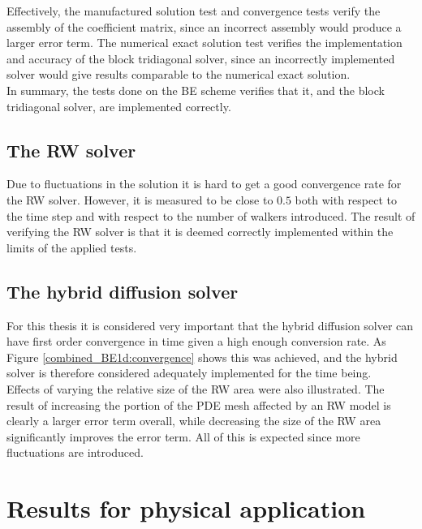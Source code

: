 \noindent Effectively, the manufactured solution test and convergence tests verify the assembly of the coefficient matrix, since an incorrect assembly would produce a larger error term. 
The numerical exact solution test verifies the implementation and accuracy of the block tridiagonal solver, since an incorrectly implemented solver would give results comparable to the numerical exact solution. \\

\noindent In summary, the tests done on the BE scheme verifies that it, and the block tridiagonal solver, are implemented correctly.

\subsection{The RW solver}
Due to fluctuations in the solution it is hard to get a good convergence rate for the RW solver. 
However, it is measured to be close to $0.5$ both with respect to the time step and with respect to the number of walkers introduced. 
The result of verifying the RW solver is that it is deemed correctly implemented within the limits of the applied tests.

\subsection{The hybrid diffusion solver}
For this thesis it is considered very important that the hybrid diffusion solver can have first order convergence in time given a high enough conversion rate. 
As Figure \ref{combined_BE1d:convergence} shows this was achieved, and the hybrid solver is therefore considered adequately implemented for the time being.\\

Effects of varying the relative size of the RW area were also illustrated. 
The result of increasing the portion of the PDE mesh affected by an RW model is clearly a larger error term overall, while decreasing the size of the RW area significantly improves the error term. 
All of this is expected since more fluctuations are introduced.

\section{Results for physical application}

